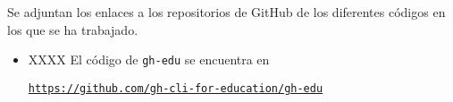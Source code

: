 Se adjuntan los enlaces a los repositorios de GitHub de los diferentes códigos en los que se ha trabajado.

\begin{itemize}
  \item XXXX
  El código de \verb|gh-edu| se encuentra en

  \href{https://github.com/gh-cli-for-education/gh-edu}{{\tt https://github.com/gh-cli-for-education/gh-edu}}

  
\end{itemize}